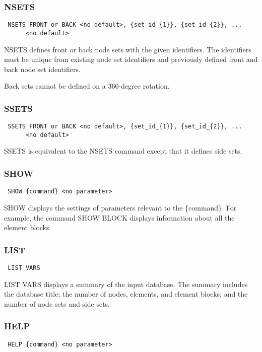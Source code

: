 \subsubsection{NSETS}
\begin{verbatim}
 NSETS FRONT or BACK <no default>, {set_id_{1}}, {set_id_{2}}, ... 
      <no default>
\end{verbatim}

NSETS defines front or back node sets with the given identifiers.  The
identifiers must be unique from existing node set identifiers and
previously defined front and back node set identifiers. 

Back sets cannot be defined on a 360-degree rotation.
\subsubsection{SSETS}
\begin{verbatim}
 SSETS FRONT or BACK <no default>, {set_id_{1}}, {set_id_{2}}, ... 
      <no default>
\end{verbatim}

SSETS is equivalent to the NSETS command except that it defines side
sets.
\subsubsection{SHOW}
\begin{verbatim}
 SHOW {command} <no parameter>
\end{verbatim}

SHOW displays the settings of parameters relevant to the \{command\}.  For
example, the command SHOW BLOCK displays information about all the
element blocks.
\subsubsection{LIST}
\begin{verbatim}
 LIST VARS
\end{verbatim}

LIST VARS displays a summary of the input database.  The summary
includes the database title; the number of nodes, elements, and element
blocks; and the number of node sets and side sets.
\subsubsection{HELP}
\begin{verbatim}
 HELP {command} <no parameter>
\end{verbatim}

